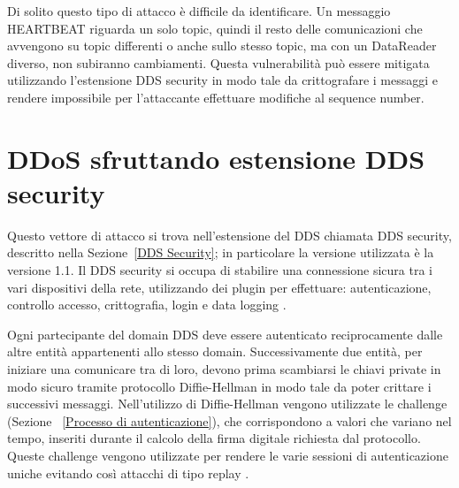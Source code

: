 Di solito questo tipo di attacco è difficile da identificare. 
Un messaggio HEARTBEAT riguarda un solo topic, quindi il resto delle
comunicazioni che avvengono su topic differenti o anche sullo stesso 
topic, ma con un DataReader diverso, non subiranno cambiamenti.
Questa vulnerabilità può essere mitigata utilizzando l'estensione
DDS security in modo tale da crittografare i messaggi e rendere 
impossibile per l'attaccante effettuare modifiche al 
sequence number. 


\section{DDoS sfruttando estensione DDS security}
Questo vettore di attacco si trova nell'estensione del DDS chiamata
DDS security, descritto nella Sezione~\ref{DDS Security}; 
in particolare la versione utilizzata è la versione 1.1.
Il DDS security si occupa di stabilire una
connessione sicura tra i vari dispositivi della rete, utilizzando 
dei plugin per effettuare: autenticazione, controllo accesso, crittografia,
login e data logging \cite{ddssecurity1.1}.

Ogni partecipante del domain DDS deve essere autenticato reciprocamente
dalle altre entità appartenenti allo stesso domain.
Successivamente due entità,
per iniziare una comunicare tra di loro, devono prima
scambiarsi le chiavi private
in modo
sicuro tramite protocollo Diffie-Hellman in modo tale da poter 
crittare i successivi
messaggi. Nell'utilizzo di Diffie-Hellman vengono utilizzate
le challenge (Sezione ~\ref{Processo di autenticazione}), 
che corrispondono a valori che variano nel tempo, 
inseriti durante il calcolo
della firma digitale richiesta dal protocollo. 
Queste challenge vengono utilizzate per rendere le varie sessioni 
di autenticazione uniche evitando così attacchi di tipo replay
\cite{DBLP:conf/asiaccs/WangLG24}.



